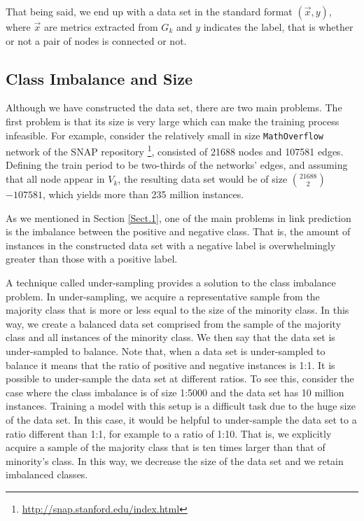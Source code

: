 \documentclass{acm_proc_article-sp}
\begin{document}
That being said, we end up with a data set in the standard format $(\vec{x},y)$, where $\vec{x}$ are metrics extracted from $G_k$ and $y$ indicates the label, that is whether or not a pair of nodes is connected or not. 

\subsection{Class Imbalance and Size}
\label{Sect.2b}
Although we have constructed the data set, there are two main problems. The first problem is that its size is very large which can make the training process infeasible. For example, consider the relatively small in size \texttt{MathOverflow} network \cite{Paranjape:2017:MTN:3018661.3018731} of the SNAP repository \footnote{\url{http://snap.stanford.edu/index.html}}, consisted of 21688 nodes and 107581 edges. Defining the train period to be two-thirds of the networks' edges, and assuming that all node appear in $V_k$, the resulting data set would be of size $21688 \choose 2$ $ - 107581$, which yields more than 235 million instances.

As we mentioned in Section \ref{Sect.1}, one of the main problems in link prediction is the imbalance between the positive and negative class. That is, the amount of instances in the constructed data set with a negative label is overwhelmingly greater than those with a positive label. 

A technique called under-sampling provides a solution to the class imbalance problem. In under-sampling, we acquire a representative sample from the majority class that is more or less equal to the size of the minority class. In this way, we create a balanced data set comprised from the sample of the majority class and all instances of the minority class. We then say that the data set is under-sampled to balance. Note that, when a data set is under-sampled to balance it means that the ratio of positive and negative instances is 1:1. It is possible to under-sample the data set at different ratios. To see this, consider the case where the class imbalance is of size 1:5000 and the data set has 10 million instances. Training a model with this setup is a difficult task due to the huge size of the data set. In this case, it would be helpful to under-sample the data set to a ratio different than 1:1, for example to a ratio of 1:10. That is, we explicitly acquire a sample of the majority class that is ten times larger than that of minority's class. In this way, we decrease the size of the data set and we retain imbalanced classes.
\end{document}
